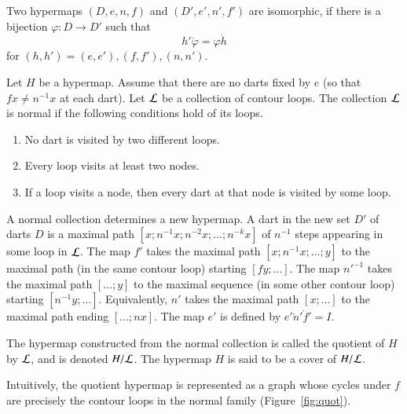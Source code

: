 \begin{definition}[isomorphic] Two hypermaps $(D,e,n,f)$ and $(D',e',n',f')$ are
isomorphic, if there is a bijection $\varphi:D\to D'$ such that
    $$h'\ocirc \varphi = \varphi\ocirc h$$
for $(h,h')=(e,e'), (f,f'), (n,n')$.
\end{definition}


\begin{definition}
Let $H$ be a hypermap. Assume that 
there are no darts fixed by $e$ 
(so that $f x \ne n^{-1} x$ at each dart). 
Let $\cal L$ be a collection of contour
loops.  The collection $\cal L$ is  normal if the following
conditions hold of its loops. \begin{enumerate}
 \item No dart is visited by two different loops.
 \item Every loop visits at least two nodes.
 \item If a loop visits a node, then every dart at that node is visited by some loop.
\end{enumerate}
\end{definition}

A normal collection determines a new hypermap.   A dart in the new set $D'$ of darts $D$ is a maximal path $[x;n^{-1} x; n^{-2} x;\ldots;n^{-k} x]$  of $n^{-1}$ steps appearing in some loop in $\cal L$. The map $f'$ takes the maximal path $[x;n^{-1}x;\ldots;y]$ to the maximal path (in the same contour loop) starting $[f y;\ldots]$. The map ${n'}^{-1}$ takes the maximal path  $[\ldots;y]$ to the maximal sequence (in some other contour loop) starting $[n^{-1}y;\ldots]$. Equivalently, $n'$ takes the maximal path $[x;\ldots]$ to the maximal path ending $[\ldots;n x]$. The map $e'$ is defined by $e'\ocirc n'\ocirc f' = I$. 

\begin{definition}[quotient]  The hypermap constructed from the normal collection is called the quotient of $H$ by $\cal L$, and is denoted $H/{\cal L}$.  The hypermap $H$ is said to be a cover of $H/{\cal L}$.
\end{definition}

Intuitively, the quotient hypermap is represented as a graph whose cycles under $f$ are precisely the contour loops in the normal family (Figure~\ref{fig:quot}).


